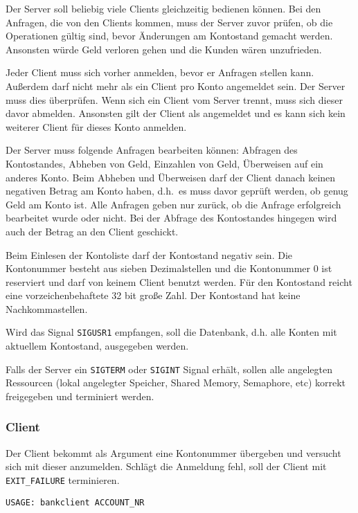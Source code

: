 Der Server soll beliebig viele Clients gleichzeitig bedienen können. Bei den
Anfragen, die von den Clients kommen, muss der Server zuvor prüfen, ob die
Operationen gültig sind, bevor Änderungen am Kontostand gemacht werden.
Ansonsten würde Geld verloren gehen und die Kunden wären unzufrieden.

Jeder Client muss sich vorher anmelden, bevor er Anfragen stellen kann.
Außerdem darf nicht mehr als ein Client pro Konto angemeldet sein. Der Server
muss dies überprüfen. Wenn sich ein Client vom Server trennt, muss sich dieser
davor abmelden. Ansonsten gilt der Client als angemeldet und es kann sich kein
weiterer Client für dieses Konto anmelden.

Der Server muss folgende Anfragen bearbeiten können: Abfragen des Kontostandes,
Abheben von Geld, Einzahlen von Geld, Überweisen auf ein anderes Konto. Beim
Abheben und Überweisen darf der Client danach keinen negativen Betrag am Konto
haben, d.h.\ es muss davor geprüft werden, ob genug Geld am Konto ist. Alle
Anfragen geben nur zurück, ob die Anfrage erfolgreich bearbeitet wurde oder
nicht. Bei der Abfrage des Kontostandes hingegen wird auch der Betrag an den
Client geschickt.

Beim Einlesen der Kontoliste darf der Kontostand negativ sein. Die Kontonummer
besteht aus sieben Dezimalstellen und die Kontonummer 0 ist reserviert und darf
von keinem Client benutzt werden. Für den Kontostand reicht eine
vorzeichenbehaftete 32 bit große Zahl.
Der Kontostand hat keine Nachkommastellen.

Wird das Signal \verb|SIGUSR1| empfangen, soll die Datenbank, d.h. alle Konten
mit aktuellem Kontostand, ausgegeben werden.

Falls der Server ein \verb|SIGTERM| oder \verb|SIGINT| Signal erhält, sollen
alle angelegten Ressourcen (lokal angelegter Speicher, Shared Memory,
Semaphore, etc) korrekt freigegeben und terminiert werden.


\subsubsection*{Client}

Der Client bekommt als Argument eine Kontonummer übergeben und versucht sich
mit dieser anzumelden. Schlägt die Anmeldung fehl, soll der Client mit
\verb|EXIT_FAILURE| terminieren.

\begin{verbatim}
USAGE: bankclient ACCOUNT_NR
\end{verbatim}

